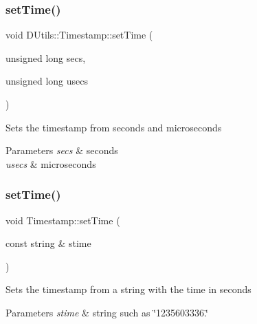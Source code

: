 \subsubsection{\texorpdfstring{set\+Time()}{setTime()}\hspace{0.1cm}{\footnotesize\ttfamily [1/3]}}
{\footnotesize\ttfamily void D\+Utils\+::\+Timestamp\+::set\+Time (\begin{DoxyParamCaption}\item[{unsigned long}]{secs,  }\item[{unsigned long}]{usecs }\end{DoxyParamCaption})\hspace{0.3cm}{\ttfamily [inline]}}

Sets the timestamp from seconds and microseconds 
\begin{DoxyParams}{Parameters}
{\em secs} & seconds \\
\hline
{\em usecs} & microseconds \\
\hline
\end{DoxyParams}
\mbox{\label{class_d_utils_1_1_timestamp_ac35ad9d35e9ce5ff6fea159e9b060bf0}} 
\subsubsection{\texorpdfstring{set\+Time()}{setTime()}\hspace{0.1cm}{\footnotesize\ttfamily [2/3]}}
{\footnotesize\ttfamily void Timestamp\+::set\+Time (\begin{DoxyParamCaption}\item[{const string \&}]{stime }\end{DoxyParamCaption})}

Sets the timestamp from a string with the time in seconds 
\begin{DoxyParams}{Parameters}
{\em stime} & string such as \char`\"{}1235603336.\char`\"{} \\
\hline
\end{DoxyParams}
\mbox{\label{class_d_utils_1_1_timestamp_a797856da2823ee26814151ea97aea5e1}} 
